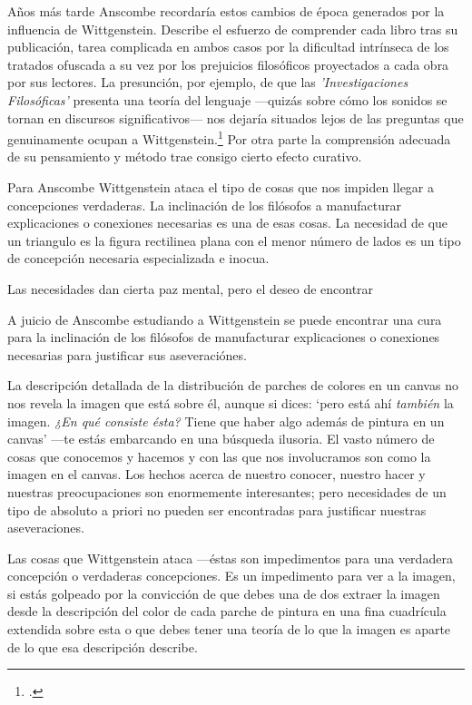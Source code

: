     Años más tarde Anscombe recordaría estos cambios de época generados por la
    influencia de Wittgenstein. Describe el esfuerzo de comprender cada libro tras
    su publicación, tarea complicada en ambos casos por la dificultad intrínseca
    de los tratados ofuscada a su vez por los prejuicios filosóficos proyectados a
    cada obra por sus lectores. La presunción, por ejemplo, de que las
    \emph{'Investigaciones Filosóficas'} presenta una teoría del lenguaje
    ---quizás sobre cómo los sonidos se tornan en discursos significativos--- nos
    dejaría situados lejos de las preguntas que genuinamente ocupan a
    Wittgenstein.\footcite[cf.~][p.~183]{twocuts} Por otra parte la comprensión
    adecuada de su pensamiento y método trae consigo cierto efecto curativo.

    Para Anscombe Wittgenstein ataca el tipo de cosas que nos impiden llegar a
    concepciones verdaderas. La inclinación de los filósofos a manufacturar
    explicaciones o conexiones necesarias es una de esas cosas. La necesidad de
    que un triangulo es la figura rectilinea plana con el menor número de lados
    es un tipo de concepción necesaria especializada e inocua.

Las necesidades dan cierta paz mental, pero el deseo de encontrar 

    A juicio de Anscombe estudiando a Wittgenstein se puede encontrar una cura
    para la inclinación de los filósofos de manufacturar explicaciones o
    conexiones necesarias para justificar sus aseveraciónes.

    La descripción detallada de la distribución de parches de colores en un
    canvas no nos revela la imagen que está sobre él, aunque si dices: `pero
    está ahí \emph{también} la imagen. \emph{¿En qué consiste ésta?} Tiene
    que haber algo además de pintura en un canvas' ---te estás embarcando en
    una búsqueda ilusoria. El vasto número de cosas que conocemos y hacemos
    y con las que nos involucramos son como la imagen en el canvas. Los
    hechos acerca de nuestro conocer, nuestro hacer y nuestras
    preocupaciones son enormemente interesantes; pero necesidades de un tipo
    de absoluto a priori no pueden ser encontradas para justificar nuestras
    aseveraciones.

    Las cosas que Wittgenstein ataca ---éstas son impedimentos para una verdadera
    concepción o verdaderas concepciones. Es un impedimento para ver a la imagen,
    si estás golpeado por la convicción de que debes una de dos extraer la imagen
    desde la descripción del color de cada parche de pintura en una fina
    cuadrícula extendida sobre esta o que debes tener una teoría de lo que la
    imagen es aparte de lo que esa descripción describe.


